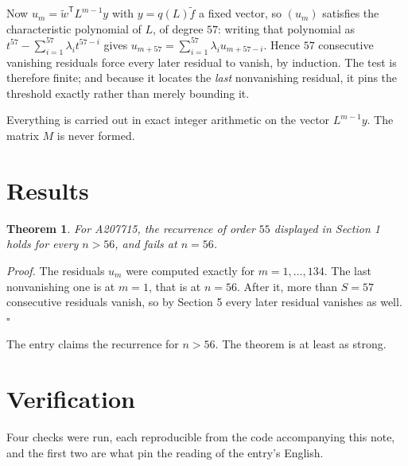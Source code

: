 \documentclass[11pt]{article}
\newtheorem{theorem}{Theorem}
\theoremstyle{definition}
\begin{document}
Now $u_m = \tilde w^{\mathsf T} L^{m-1} y$ with $y = q(L)\tilde f$ a fixed vector, so $(u_m)$ satisfies the characteristic polynomial of $L$, of degree $57$: writing that polynomial as $t^{57} - \sum_{i=1}^{57} \lambda_i t^{57-i}$ gives $u_{m+57} = \sum_{i=1}^{57} \lambda_i u_{m+57-i}$. Hence $57$ consecutive vanishing residuals force every later residual to vanish, by induction. The test is therefore finite; and because it locates the {\itshape last} nonvanishing residual, it pins the threshold exactly rather than merely bounding it.

Everything is carried out in exact integer arithmetic on the vector $L^{m-1}y$. The matrix $M$ is never formed.

\section{Results}

\begin{theorem} For A207715, the recurrence of order $55$ displayed in Section 1 holds for every $n > 56$, and fails at $n = 56$.\end{theorem}

{\itshape Proof.} The residuals $u_m$ were computed exactly for $m = 1,\dots,134$. The last nonvanishing one is at $m = 1$, that is at $n = 56$. After it, more than $S = 57$ consecutive residuals vanish, so by Section 5 every later residual vanishes as well. $\square$

The entry claims the recurrence for $n > 56$. The theorem is at least as strong.

\section{Verification}

Four checks were run, each reproducible from the code accompanying this note, and the first two are what pin the reading of the entry's English.
\end{document}
